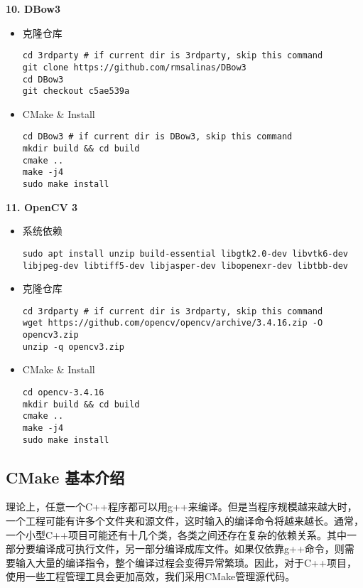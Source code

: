 \noindent \textbf{10. DBow3}
\begin{itemize}[itemsep=0.1pt,topsep =2pt]
    \item 克隆仓库
\begin{lstlisting}[style=bash]
cd 3rdparty # if current dir is 3rdparty, skip this command
git clone https://github.com/rmsalinas/DBow3
cd DBow3
git checkout c5ae539a
\end{lstlisting}   
    \item CMake \& Install
\begin{lstlisting}[style=bash]
cd DBow3 # if current dir is DBow3, skip this command
mkdir build && cd build
cmake ..
make -j4
sudo make install
\end{lstlisting}   
\end{itemize}

\noindent \textbf{11. OpenCV 3}
\begin{itemize}[itemsep=0.1pt,topsep =2pt]
    \item 系统依赖
\begin{lstlisting}[style=bash]
sudo apt install unzip build-essential libgtk2.0-dev libvtk6-dev libjpeg-dev libtiff5-dev libjasper-dev libopenexr-dev libtbb-dev
\end{lstlisting}
    \item 克隆仓库
\begin{lstlisting}[style=bash]
cd 3rdparty # if current dir is 3rdparty, skip this command
wget https://github.com/opencv/opencv/archive/3.4.16.zip -O opencv3.zip
unzip -q opencv3.zip
\end{lstlisting}   
    \item CMake \& Install
\begin{lstlisting}[style=bash]
cd opencv-3.4.16
mkdir build && cd build
cmake ..
make -j4
sudo make install
\end{lstlisting}   
\end{itemize}

\subsection{CMake 基本介绍}
理论上，任意一个C++程序都可以用g++来编译。但是当程序规模越来越大时，一个工程可能有许多个文件夹和源文件，这时输入的编译命令将越来越长。通常，一个小型C++项目可能还有十几个类，各类之间还存在复杂的依赖关系。其中一部分要编译成可执行文件，另一部分编译成库文件。如果仅依靠g++命令，则需要输入大量的编译指令，整个编译过程会变得异常繁琐。因此，对于C++项目，使用一些工程管理工具会更加高效，我们采用CMake管理源代码。

